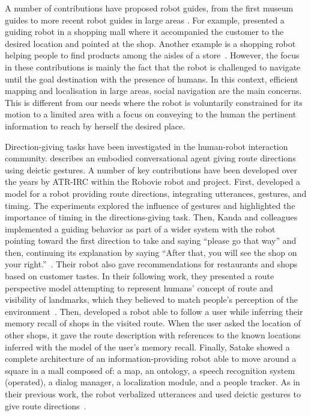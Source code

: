 \documentclass[a4paper,11pt,twoside]{StyleThese}
\begin{document}
A number of contributions have proposed robot guides, from the first museum guides \citep{burgard_1999_museum, thrun_99, siegwart_2003_robox, clodic_2006_rackham} to more recent robot guides in large areas \citep{bauer_2009_autonomous, triebel_2016_spencer}. For example, \cite{chen_2017_robots} presented a guiding robot in a shopping mall where it accompanied the customer to the desired location and pointed at the shop. Another example is a shopping robot helping people to find products among the aisles of a store~\citep{gross_2009_toomas}. 
However, the focus in these contributions is mainly the fact that the robot is challenged to navigate until the goal destination with the presence of humans. In this context, efficient mapping and localisation in large areas, social navigation are the main concerns. This is different from our needs where the robot is voluntarily constrained for its motion to a limited area with a focus on conveying to the human the pertinent information to reach by herself the desired place.

Direction-giving tasks have been investigated in the human-robot interaction community. \cite{kopp_2007} describes an embodied conversational agent giving route directions using deictic gestures. A number of key contributions have been developed over the years by ATR-IRC within the Robovie robot and project. First, \cite{okuno_2009_providing} developed a model for a robot providing route directions, integrating utterances, gestures, and timing. The experiments explored the influence of gestures and highlighted the importance of timing in the directions-giving task. Then, Kanda and colleagues implemented a guiding behavior as part of a wider system with the robot pointing toward the first direction to take and saying ``please go that way'' and then, continuing its explanation by saying ``After that, you will see the shop on your right.''~\citep{kanda_2009_affective, kanda_2010_communication}. Their robot also gave recommendations for restaurants and shops based on customer tastes. In their following work, they presented a route perspective model attempting to represent humans' concept of route and visibility of landmarks, which they believed to match people's perception of the environment~\citep{morales_2011}. Then, \cite{matsumoto_2012_you} developed a robot able to follow a user while inferring their memory recall of shops in the visited route. When the user asked the location of other shops, it gave the route description with references to the known locations inferred with the model of the user's memory recall. Finally, Satake \etal{} showed a complete architecture of an information-providing robot able to move around a square in a mall composed of: a map, an ontology, a speech recognition system (operated), a dialog manager, a localization module, and a people tracker. As in their previous work, the robot verbalized utterances and used deictic gestures to give route directions~\cite{satake_2015_should}. 
\end{document}
